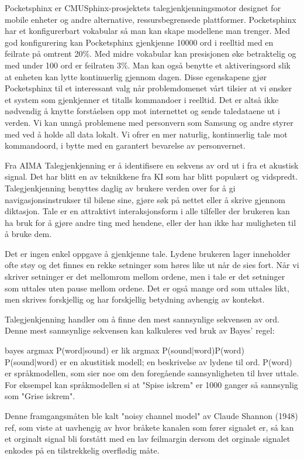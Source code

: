 {Pocketsphinx er CMUSphinx-prosjektets talegjenkjenningsmotor designet for mobile enheter og andre alternative, ressursbegrensede plattformer. Pocketsphinx har et konfigurerbart vokabular så man kan skape modellene man trenger. Med god konfigurering kan Pocketsphinx gjenkjenne 10000 ord i reelltid med en feilrate på omtrent 20\%. Med midre vokabular kan presisjonen øke betraktelig og med under 100 ord er feilraten 3\%. Man kan også benytte et aktiveringsord slik at enheten kan lytte kontinuerlig gjennom dagen. Disse egenskapene gjør Pocketsphinx til et interessant valg når problemdomenet vårt tilsier at vi ønsker et system som gjenkjenner et titalls kommandoer i reelltid. Det er altså ikke nødvendig å knytte forståelsen opp mot internettet og sende taledataene ut i verden. Vi kan unngå problemene med personvern som Samsung og andre styrer med ved å holde all data lokalt. Vi ofrer en mer naturlig, kontinuerlig tale mot kommandoord, i bytte med en garantert bevarelse av personvernet.

{\color{blue}Fra AIMA}
Talegjenkjenning er å identifisere en sekvens av ord ut i fra et akustisk signal. Det har blitt en av teknikkene fra KI som har blitt populært og vidspredt. Talegjenkjenning benyttes daglig av brukere verden over for å gi navigasjonsinstrukser til bilene sine, gjøre søk på nettet eller å skrive gjennom diktasjon. Tale er en attraktivt interaksjonsform i alle tilfeller der brukeren kan ha bruk for å gjøre andre ting med hendene, eller der han ikke har muligheten til å bruke dem.

Det er ingen enkel oppgave å gjenkjenne tale. Lydene brukeren lager inneholder ofte støy og det finnes en rekke setninger som høres like ut når de sies fort. Når vi skriver setninger er det mellomrom mellom ordene, men i tale er det setninger som uttales uten pause mellom ordene. Det er også mange ord som uttales likt, men skrives forskjellig og har forskjellig betydning avhengig av kontekst.

Talegjenkjenning handler om å finne den mest sannsynlige sekvensen av ord. Denne mest sannsynlige sekvensen kan kalkuleres ved bruk av Bayes' regel:

{\color{red}bayes} argmax P(word|sound) er lik argmax P(sound|word)P(word)
P(sound|word) er en akustitisk modell; en beskrivelse av lydene til ord. P(word) er språkmodellen, som sier noe om den foregående sannsynligheten til hver uttale. For eksempel kan språkmodellen si at "Spise iskrem" er 1000 ganger så sannsynlig som "Grise iskrem".

Denne framgangsmåten ble kalt "noisy channel model" av Claude Shannon (1948) {\color{red}ref}, som viste at uavhengig av hvor bråkete kanalen som fører signalet er, så kan et orginalt signal bli forstått med en lav feilmargin dersom det orginale signalet enkodes på en tilstrekkelig overflødig måte.

}
